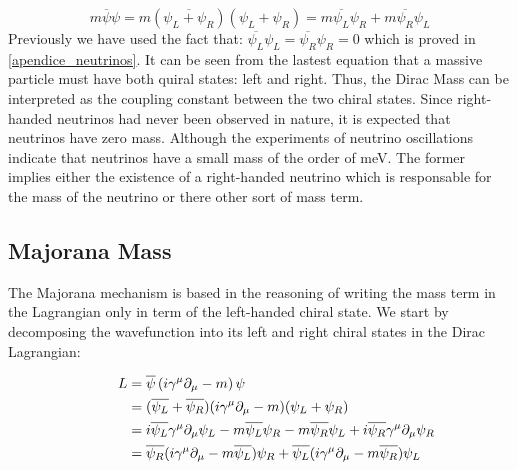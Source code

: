 \begin{equation}
 m \overline{\psi} \psi = m \left( \overbar{\psi_L + \psi_R} \right) \left( \psi_L + \psi_R \right) = m \overline{\psi_L} \psi_R + m \overline{\psi_R}\psi_L
\end{equation} \label{Dirac mass term}
Previously we have used the fact that: $\overline{\psi_L}\psi_L = \overline{\psi_R}\psi_R = 0$ which is proved in \ref{apendice_neutrinos}. It can be seen from the lastest equation
that a massive particle must have both quiral states: left and right. Thus, the Dirac Mass can be interpreted as the coupling constant between the two chiral states. Since right-handed 
neutrinos had never been observed in nature, it is expected that neutrinos have zero mass. Although the experiments of neutrino oscillations indicate that neutrinos have a small mass of the order of meV. The former implies either the existence of a right-handed neutrino which is responsable for the mass of the neutrino or there other sort of mass term.

\subsection{Majorana Mass}


The Majorana mechanism is based in the reasoning of writing the mass term in the Lagrangian only in term of the left-handed chiral state. We start by decomposing the wavefunction into its left and right chiral states in the Dirac Lagrangian: 


\begin{align}
  \phantom{i = j = k}
  &\begin{aligned}
    \mathllap{L} &= \overline{\psi} \left( i \gamma ^\mu \partial_{\mu} - m \right) \psi \\
    \mathllap{}  &= (\overline{\psi_L} + \overline{\psi_R})( i \gamma ^\mu \partial_{\mu} - m)(\psi_L + \psi_R) \\
   \mathllap{} &= i \overline{\psi_L} \gamma ^\mu \partial_{\mu} \psi_L - m \overline{\psi_L} \psi_R - m \overline{\psi_R} \psi_L + i \overline{\psi_R} \gamma ^\mu \partial_{\mu} \psi_R \\
   \mathllap{} &= \overline{\psi_R} (i \gamma^\mu \partial_{\mu} - m\overline{\psi_L}) \psi_R + \overline{\psi_L} (i \gamma^\mu \partial_\mu - m \overline{\psi_R}) \psi_L
   \end{aligned}
\end{align}

